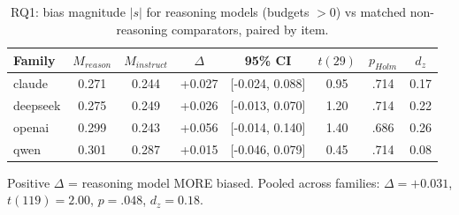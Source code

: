 \begin{table}[t]
\centering
\caption{RQ1: bias magnitude $|s|$ for reasoning models (budgets $>0$) vs matched non-reasoning comparators, paired by item.}
\label{tab:rq1}
\small
\begin{tabular}{lccccccc}
\hline
Family & $M_{reason}$ & $M_{instruct}$ & $\Delta$ & 95\% CI & $t(29)$ & $p_{Holm}$ & $d_z$ \\
\hline
claude & 0.271 & 0.244 & +0.027 & [-0.024, 0.088] & 0.95 & .714 & 0.17 \\
deepseek & 0.275 & 0.249 & +0.026 & [-0.013, 0.070] & 1.20 & .714 & 0.22 \\
openai & 0.299 & 0.243 & +0.056 & [-0.014, 0.140] & 1.40 & .686 & 0.26 \\
qwen & 0.301 & 0.287 & +0.015 & [-0.046, 0.079] & 0.45 & .714 & 0.08 \\
\hline
\end{tabular}
\par\smallskip\footnotesize Positive $\Delta$ = reasoning model MORE biased. Pooled across families: $\Delta=+0.031$, $t(119)=2.00$, $p=.048$, $d_z=0.18$.
\end{table}
